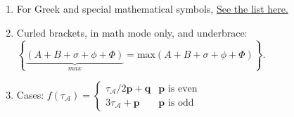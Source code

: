 \documentclass[pre,aps,reprint,noshowpacs,superscriptaddress,floatfix,letterpaper,longbibliography]{revtex4-2}
\newcommand{\NiceSubscript}{\tau_{\!\scriptscriptstyle\mathcal{A}}}
\newcommand{\bp}{\boldsymbol{p}}
\newcommand{\bq}{\boldsymbol{q}}
\begin{document}
\begin{enumerate}
\item For Greek and special mathematical symbols,  \href{https://garsia.math.yorku.ca/~zabrocki/latexpanel/latexpanel.pdf}{See the list here.} 

\item Curled brackets, in math mode only, and underbrace: \\ 
$\left\{ \underbrace{(A+B+\sigma+\phi+\Phi)}_{max}=\text{max}(A+B+\sigma+\phi+\Phi)\right\}$. 

\item Cases: $f(\NiceSubscript) = \begin{cases}
  \NiceSubscript/2\bp+\bq  & \bp \text{ is even} \\
  3\NiceSubscript+\bp & \bp \text{ is odd}
\end{cases}$ 

\label{List:Equations}
\end{enumerate} 

\end{document}
